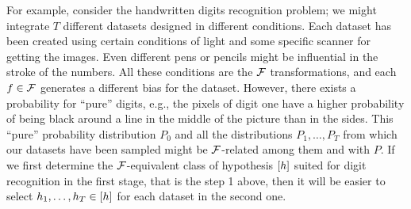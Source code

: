 For example, consider the handwritten digits recognition problem; we might integrate $T$ different datasets designed in different conditions. Each dataset has been created using certain conditions of light and some specific scanner for getting the images. Even different pens or pencils might be influential in the stroke of the numbers. All these conditions are the $\mathcal{F}$ transformations, and each $f \in \mathcal{F}$ generates a different bias for the dataset. However, there exists a probability for ``pure'' digits, e.g., the pixels of digit one have a higher probability of being black around a line in the middle of the picture than in the sides. This ``pure'' probability distribution $P_0$ and all the distributions $P_1, \ldots, P_T$ from which our datasets have been sampled might be $\mathcal{F}$-related among them and with $P$. If we first determine the $\mathcal{F}$-equivalent class of hypothesis $\lbrack h\rbrack$ suited for digit recognition in the first stage, that is the step 1 above, then it will be easier to select $h_1, \ldots, h_T \in \lbrack h\rbrack$ for each dataset in the second one.


